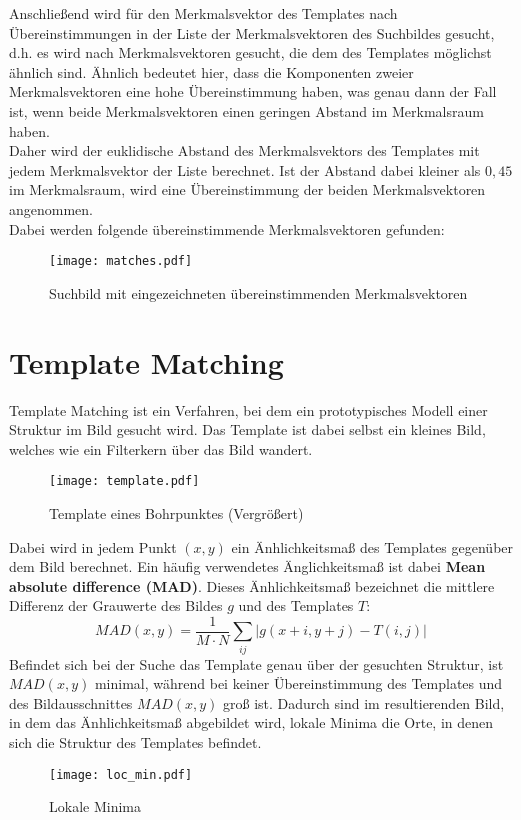 Anschließend wird für den Merkmalsvektor des Templates nach Übereinstimmungen in der Liste der Merkmalsvektoren des Suchbildes gesucht, d.h. es wird nach Merkmalsvektoren gesucht, die dem des Templates möglichst ähnlich sind. Ähnlich bedeutet hier, dass die Komponenten zweier Merkmalsvektoren eine hohe Übereinstimmung haben, was genau dann der Fall ist, wenn beide Merkmalsvektoren einen geringen Abstand im Merkmalsraum haben. \\
Daher wird der euklidische Abstand des Merkmalsvektors des Templates mit jedem Merkmalsvektor der Liste berechnet. Ist der Abstand dabei kleiner als $0,45$ im Merkmalsraum, wird eine Übereinstimmung der beiden Merkmalsvektoren angenommen.\\
Dabei werden folgende übereinstimmende Merkmalsvektoren gefunden:
\begin{figure}[H]
  \begin{center}
    \texttt{[image: matches.pdf]}
    \caption{Suchbild mit eingezeichneten übereinstimmenden Merkmalsvektoren}
    \label{fig:suchbild_merkmal_matches}
  \end{center}
\end{figure}

 

\section{Template Matching}
	Template Matching ist ein Verfahren, bei dem ein prototypisches Modell einer Struktur im Bild gesucht wird. Das Template ist dabei selbst ein kleines Bild, welches wie ein Filterkern über das Bild wandert.
\begin{figure}[H]
  \begin{center}
    \texttt{[image: template.pdf]}
    \caption{Template eines Bohrpunktes (Vergrößert)}
    \label{fig:template}
  \end{center}
\end{figure}
Dabei wird in jedem Punkt $(x, y)$ ein Änhlichkeitsmaß des Templates gegenüber dem Bild berechnet.
Ein häufig verwendetes Änglichkeitsmaß ist dabei \textbf{Mean absolute difference (MAD)}.
Dieses Änhlichkeitsmaß bezeichnet die mittlere Differenz der Grauwerte des Bildes $g$ und des Templates $T$:
\begin{equation*}
MAD(x, y) = \frac{1}{M \cdot N} \sum_{ij}^{{}} \left | g(x +i, y + j) - T(i, j) \right |
\end{equation*}
Befindet sich bei der Suche das Template genau über der gesuchten Struktur, ist $MAD(x, y)$ minimal, während bei keiner Übereinstimmung des Templates und des Bildausschnittes $MAD(x, y)$ groß ist. Dadurch sind im resultierenden Bild, in dem das Änhlichkeitsmaß abgebildet wird, lokale Minima die Orte, in denen sich die Struktur des Templates befindet.
\begin{figure}[H]
  \begin{center}
    \texttt{[image: loc\_min.pdf]}
    \caption{Lokale Minima}
    \label{fig:localminima}
  \end{center}
\end{figure}

